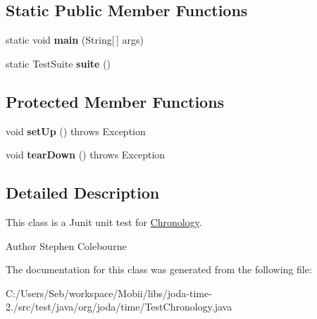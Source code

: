 \subsection*{Static Public Member Functions}
\begin{DoxyCompactItemize}
\item 
\hypertarget{classorg_1_1joda_1_1time_1_1_test_chronology_a8cedc2e3a6deeb2a160f3db4a916d4de}{static void {\bfseries main} (String\mbox{[}$\,$\mbox{]} args)}\label{classorg_1_1joda_1_1time_1_1_test_chronology_a8cedc2e3a6deeb2a160f3db4a916d4de}

\item 
\hypertarget{classorg_1_1joda_1_1time_1_1_test_chronology_a8ef86ec738772a184dc0707853cf78ea}{static Test\-Suite {\bfseries suite} ()}\label{classorg_1_1joda_1_1time_1_1_test_chronology_a8ef86ec738772a184dc0707853cf78ea}

\end{DoxyCompactItemize}
\subsection*{Protected Member Functions}
\begin{DoxyCompactItemize}
\item 
\hypertarget{classorg_1_1joda_1_1time_1_1_test_chronology_aa0f5ad7d6affb51426e8c582c380abc3}{void {\bfseries set\-Up} ()  throws Exception }\label{classorg_1_1joda_1_1time_1_1_test_chronology_aa0f5ad7d6affb51426e8c582c380abc3}

\item 
\hypertarget{classorg_1_1joda_1_1time_1_1_test_chronology_ab91cf4f009eaa681875dfd1ce53e4a11}{void {\bfseries tear\-Down} ()  throws Exception }\label{classorg_1_1joda_1_1time_1_1_test_chronology_ab91cf4f009eaa681875dfd1ce53e4a11}

\end{DoxyCompactItemize}


\subsection{Detailed Description}
This class is a Junit unit test for \hyperlink{classorg_1_1joda_1_1time_1_1_chronology}{Chronology}.

\begin{DoxyAuthor}{Author}
Stephen Colebourne 
\end{DoxyAuthor}


The documentation for this class was generated from the following file\-:\begin{DoxyCompactItemize}
\item 
C\-:/\-Users/\-Seb/workspace/\-Mobii/libs/joda-\/time-\/2./src/test/java/org/joda/time/Test\-Chronology.\-java\end{DoxyCompactItemize}

